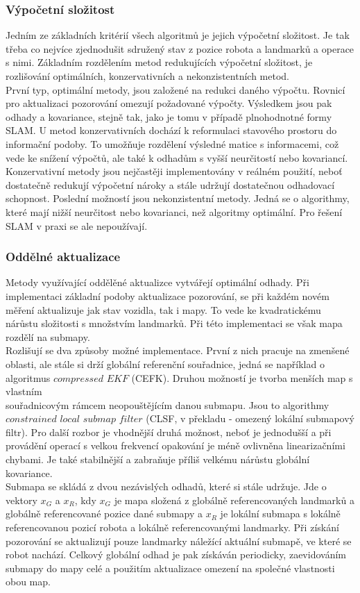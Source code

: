 \documentclass[12pt]{report}
\begin{document}
\subsubsection{Výpočetní složitost}
Jedním ze základních kritérií všech algoritmů je jejich výpočetní složitost. Je tak třeba co nejvíce zjednodušit sdružený stav z pozice robota a landmarků a operace s nimi. Základním rozdělením metod redukujících výpočetní složitost, je rozlišování optimálních, konzervativních a nekonzistentních metod.\\ 
\indent První typ, optimální metody, jsou založené na redukci daného výpočtu. Rovnicí pro aktualizaci pozorování omezují požadované výpočty. Výsledkem jsou pak odhady a kovariance, stejně tak, jako je tomu v případě plnohodnotné formy SLAM. U metod konzervativních dochází k reformulaci stavového prostoru do informační podoby. To umožňuje rozdělení výsledné matice s informacemi, což vede ke snížení výpočtů, ale také k odhadům s vyšší neurčitostí nebo kovariancí. Konzervativní metody jsou nejčastěji implementovány v reálném použití, neboť dostatečně redukují výpočetní nároky a stále udržují dostatečnou odhadovací schopnost. Poslední možností jsou nekonzistentní metody. Jedná se o algorithmy, které mají nižší neurčitost nebo kovarianci, než algoritmy optimální. Pro řešení SLAM v praxi se ale nepoužívají.

\subsubsection{Oddělné aktualizace}
Metody využívající oddělěné aktualizce vytvářejí optimální odhady. Při implementaci základní podoby aktualizace pozorování, se při každém novém měření aktualizuje jak stav vozidla, tak i mapy. To vede ke kvadratickému nárůstu složitosti s množstvím landmarků. Při této implementaci se však mapa rozdělí na submapy.\\
\indent Rozlišují se dva způsoby možné implementace. První z nich pracuje na zmenšené oblasti, ale stále si drží globální referenční souřadnice, jedná se například o algoritmus $compressed$ $EKF$ (CEFK). Druhou možností je tvorba menších map s vlastním\\ souřadnicovým rámcem neopouštějícím danou submapu. Jsou to algorithmy $constrained$ $local$ $submap$ $filter$ (CLSF, v překladu - omezený lokální submapový filtr). Pro další rozbor je vhodnější druhá možnost, neboť je jednodušší a při provádění operací s velkou frekvencí opakování je méně ovlivněna linearizačními chybami. Je také stabilnější a zabraňuje příliš velkému nárůstu globální kovariance. \\
\indent Submapa se skládá z dvou nezávislých odhadů, které si stále udržuje. Jde o vektory $x_G$ a $x_R$, kdy $x_G$ je mapa složená z globálně referencovaných landmarků a globálně referencované pozice dané submapy a $x_R$ je lokální submapa s lokálně referencovanou pozicí robota a lokálně referencovanými landmarky. Při získání pozorování se aktualizují pouze landmarky náležící aktuální submapě, ve které se robot nachází. Celkový globální odhad je pak získáván periodicky, zaevidováním submapy do mapy celé a použitím aktualizace omezení na společné vlastnosti obou map.
\end{document}
